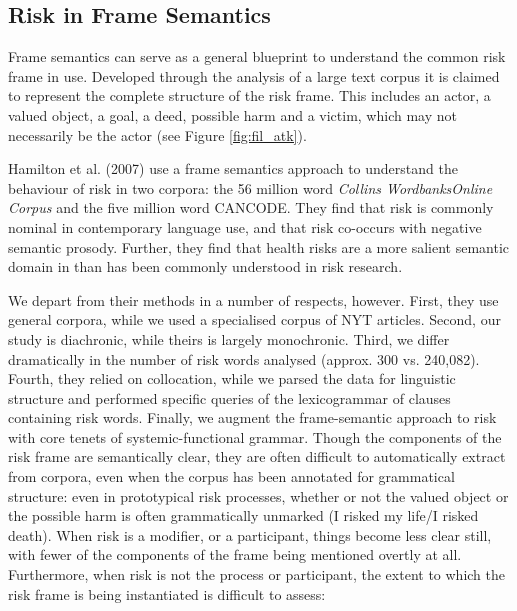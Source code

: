 \subsection{Risk in Frame Semantics}

Frame semantics can serve as a general blueprint to understand the common risk frame in use. Developed through the analysis of a large text corpus it is claimed to represent the complete structure of the risk frame. This includes an actor, a valued object, a goal, a deed, possible harm and a victim, which may not necessarily be the actor (see Figure \ref{fig:fil_atk}).



Hamilton et al. (2007) use a frame semantics approach to understand the behaviour of risk in two corpora: the 56 million word \emph{Collins WordbanksOnline Corpus} and the five million word CANCODE. They find that risk is commonly nominal in contemporary language use, and that risk co-occurs with  negative semantic prosody. Further, they find that health risks are a more salient semantic domain in than has been commonly understood in risk research.

We depart from their methods in a number of respects, however. First, they use general corpora, while we used a specialised corpus of NYT articles. Second, our study is diachronic, while theirs is largely monochronic. Third, we differ dramatically in the number of risk words analysed (approx. 300 vs. 240,082). Fourth, they relied on collocation, while we parsed the data for linguistic structure and performed specific queries of the lexicogrammar of clauses containing risk words. Finally, we augment the frame-semantic approach to risk with core tenets of systemic-functional grammar. Though the components of the risk frame are semantically clear, they are often difficult to automatically extract from corpora, even when the corpus has been annotated for grammatical structure: even in prototypical risk processes, whether or not the valued object or the possible harm is often grammatically unmarked (I risked my life\slash I risked death). When risk is a modifier, or a participant, things become less clear still, with fewer of the components of the frame being mentioned overtly at all. Furthermore, when risk is not the process or participant, the extent to which the risk frame is being instantiated is difficult to assess:

